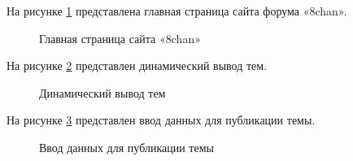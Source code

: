 На рисунке \ref{main:image} представлена главная страница сайта форума «8chan».

\begin{figure}[H] %
\caption{Главная страница сайта «8chan»}
\label{main:image}
\end{figure}

На рисунке \ref{menu:image} представлен динамический вывод тем.

\begin{figure}[ht]
\caption{Динамический вывод тем}
\label{menu:image}
\end{figure}

На рисунке \ref{enter:image} представлен ввод данных для публикации темы.

\begin{figure}[ht]
\caption{Ввод данных для публикации темы}
\label{enter:image}
\end{figure}
